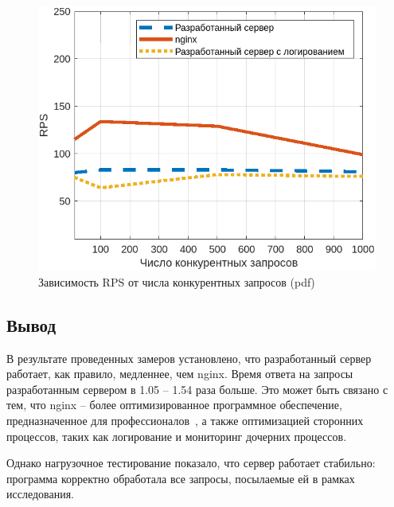 \captionsetup{singlelinecheck = false, justification=centering}
\begin{figure}[H]
	\centering
	\includegraphics[scale=1.1]{img/pdf-c.png}
	\caption{Зависимость RPS от числа конкурентных запросов (pdf)}
	\label{pdf-comparison-c}
\end{figure}

\subsection*{Вывод}

В результате проведенных замеров установлено, что разработанный сервер работает, как правило, медленнее, чем nginx. Время ответа на запросы разработанным сервером в 1.05 -- 1.54 раза больше. Это может быть связано с тем, что nginx -- более оптимизированное программное обеспечение, предназначенное для профессионалов~\cite{nginx-tuning}, а также оптимизацией сторонних процессов, таких как логирование и мониторинг дочерних процессов.

Однако нагрузочное тестирование показало, что сервер работает стабильно: программа корректно обработала все запросы, посылаемые ей в рамках исследования.

\pagebreak